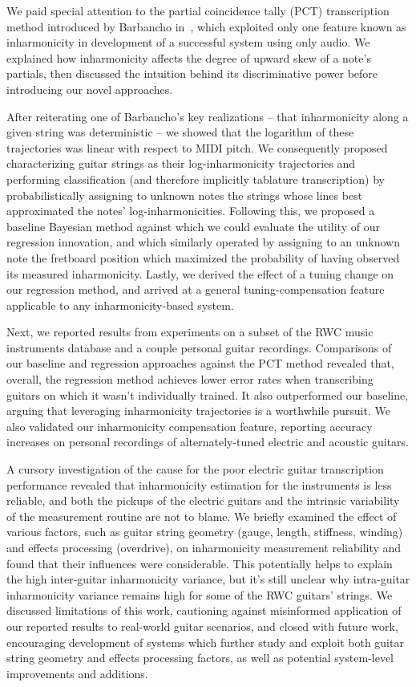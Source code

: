 \documentclass[12pt]{cmuthesis}
\begin{document}
We paid special attention to the partial coincidence tally (PCT) transcription method introduced by Barbancho in~\cite{barbanchoi2012}, which exploited only one feature known as inharmonicity in development of a successful system using only audio. We explained how inharmonicity affects the degree of upward skew of a note's partials, then discussed the intuition behind its discriminative power before introducing our novel approaches.

After reiterating one of Barbancho's key realizations -- that inharmonicity along a given string was deterministic -- we showed that the logarithm of these trajectories was linear with respect to MIDI pitch. We consequently proposed characterizing guitar strings as their log-inharmonicity trajectories and performing classification (and therefore implicitly tablature transcription) by probabilistically assigning to unknown notes the strings whose lines best approximated the notes' log-inharmonicities. Following this, we proposed a baseline Bayesian method against which we could evaluate the utility of our regression innovation, and which similarly operated by assigning to an unknown note the fretboard position which maximized the probability of having observed its measured inharmonicity. Lastly, we derived the effect of a tuning change on our regression method, and arrived at a general tuning-compensation feature applicable to any inharmonicity-based system.

Next, we reported results from experiments on a subset of the RWC music instruments database and a couple personal guitar recordings. Comparisons of our baseline and regression approaches against the PCT method revealed that, overall, the regression method achieves lower error rates when transcribing guitars on which it wasn't individually trained. It also outperformed our baseline, arguing that leveraging inharmonicity trajectories is a worthwhile pursuit. We also validated our inharmonicity compensation feature, reporting accuracy increases on personal recordings of alternately-tuned electric and acoustic guitars.

A cursory investigation of the cause for the poor electric guitar transcription performance revealed that inharmonicity estimation for the instruments is less reliable, and both the pickups of the electric guitars and the intrinsic variability of the measurement routine are not to blame. We briefly examined the effect of various factors, such as guitar string geometry (gauge, length, stiffness, winding) and effects processing (overdrive), on inharmonicity measurement reliability and found that their influences were considerable. This potentially helps to explain the high inter-guitar inharmonicity variance, but it's still unclear why intra-guitar inharmonicity variance remains high for some of the RWC guitars' strings. We discussed limitations of this work, cautioning against misinformed application of our reported results to real-world guitar scenarios, and closed with future work, encouraging development of systems which further study and exploit both guitar string geometry and effects processing factors, as well as potential system-level improvements and additions.
\end{document}
